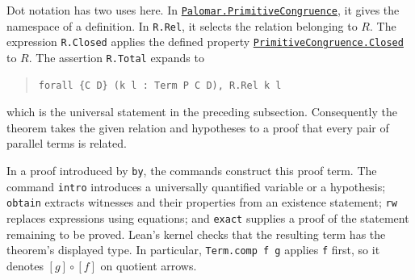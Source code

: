 \documentclass[11pt]{article}
\begin{document}
Dot notation has two uses here. In
\href{https://github.com/flengyel/Dosen-Petric-Maximality/blob/5dbee39bea09539bd130f729e82636419f71f920/DosenPetric/PalomarDefinitions.lean\#L14}{\texttt{Palomar.PrimitiveCongruence}}, it gives the namespace of a
definition. In \texttt{R.Rel}, it selects the relation belonging
to $R$. The expression \texttt{R.Closed} applies the defined
property \href{https://github.com/flengyel/Dosen-Petric-Maximality/blob/5dbee39bea09539bd130f729e82636419f71f920/DosenPetric/PalomarDefinitions.lean\#L31}{\texttt{PrimitiveCongruence.Closed}} to $R$.
The assertion \texttt{R.Total} expands to
\begin{quote}
\begin{verbatim}
forall {C D} (k l : Term P C D), R.Rel k l
\end{verbatim}
\end{quote}
which is the universal statement in the preceding subsection.
Consequently the theorem takes the given relation and hypotheses
to a proof that every pair of parallel terms is related.

In a proof introduced by \texttt{by}, the commands construct this
proof term. The command \texttt{intro} introduces a universally
quantified variable or a hypothesis; \texttt{obtain} extracts
witnesses and their properties from an existence statement;
\texttt{rw} replaces expressions using equations; and
\texttt{exact} supplies a proof of the statement remaining to
be proved. Lean's kernel checks that the resulting term has the theorem's displayed type.
In particular, \texttt{Term.comp f g} applies \texttt{f} first,
so it denotes $[g]\circ[f]$ on quotient arrows.
\end{document}
